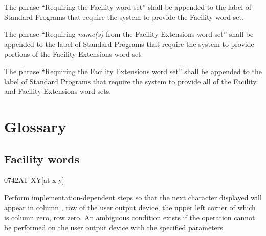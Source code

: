 The phrase ``Requiring the Facility word set'' shall be appended to
the label of Standard Programs that require the system to provide
the Facility word set.

The phrase ``Requiring \emph{name(s)} from the Facility Extensions
word set'' shall be appended to the label of Standard Programs that
require the system to provide portions of the Facility Extensions
word set.

The phrase ``Requiring the Facility Extensions word set'' shall be
appended to the label of Standard Programs that require the system
to provide all of the Facility and Facility Extensions word sets.

\section{Glossary} %

\subsection{Facility words} %

\begin{worddef}{0742}{AT-XY}[at-x-y]
\item {}

	Perform implementation-dependent steps so that the next
	character displayed will appear in column , row
	 of the user output device, the upper left corner
	of which is column zero, row zero. An ambiguous condition exists
	if the operation cannot be performed on the user output device
	with the specified parameters.
\end{worddef}


